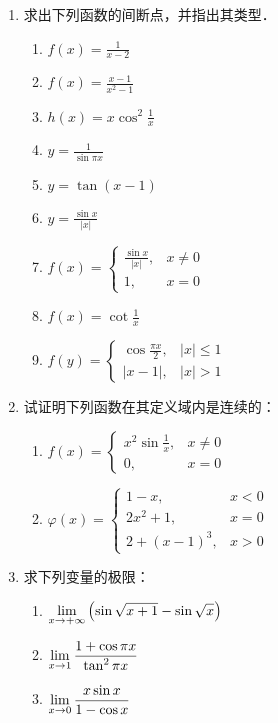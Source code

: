 \begin{ex}
\begin{enumerate}
\item 求出下列函数的间断点，并指出其类型．
\begin{multicols}{2}
\begin{enumerate}
    \item $f(x)=\frac{1}{x-2}$
    \item $f(x)=\frac{x-1}{x^2-1}$
    \item $h(x)=x\cos^2 \frac{1}{x}$
    \item $y=\frac{1}{\sin\pi x}$
    \item $y=\tan(x-1)$
    \item $y=\frac{\sin x}{|x|}$
    \item $f(x)=\begin{cases}
        \frac{\sin x}{|x|},&x\ne 0\\
        1,& x=0
    \end{cases}$
    \item $f(x)=\cot\frac{1}{x}$
    \item $f(y)=\begin{cases}
        \cos\frac{\pi x}{2},& |x|\le 1\\
        |x-1|,& |x|>1
    \end{cases}$
\end{enumerate}
\end{multicols}
\item 试证明下列函数在其定义域内是连续的：
\begin{enumerate}
    \item $f(x)=\begin{cases}
        x^2\sin\frac{1}{x},&x\ne 0\\
        0,&x=0
    \end{cases}$
    \item $\varphi(x)=\begin{cases}
        1-x,& x<0\\
        2x^2+1,& x=0\\
        2+(x-1)^3,& x>0
    \end{cases}$
\end{enumerate}
\item 求下列变量的极限：
\begin{multicols}{2}
    \begin{enumerate}
\item $\displaystyle\lim_{x\to+\infty}\left(\sin\sqrt{x+1}-\sin\sqrt{x}\right)$
\item $\displaystyle\lim_{x\to 1}\dfrac{1+\cos\pi x}{\tan^2 \pi x}$
\item $\displaystyle\lim_{x\to 0}\dfrac{x\sin x}{1-\cos x}$

\end{enumerate}
\end{multicols}
\end{enumerate}
\end{ex}
